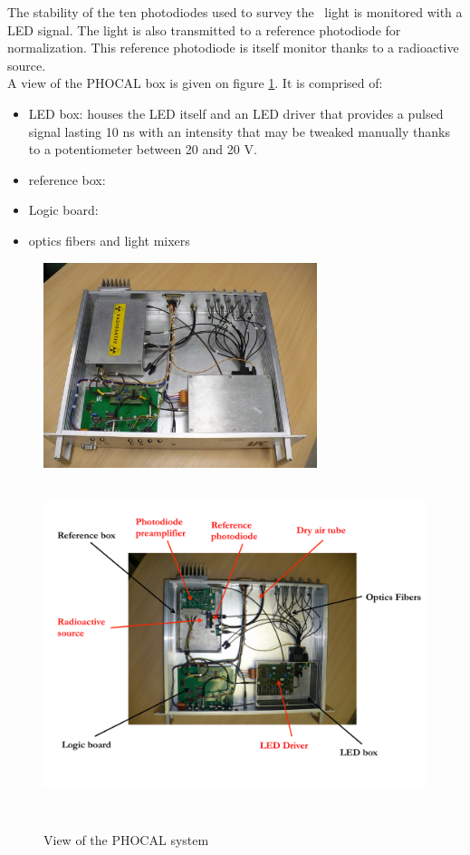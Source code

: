 The stability of the ten photodiodes used to survey the \laser~light is monitored with a LED signal. The light is also transmitted to a reference photodiode for normalization. This reference photodiode is itself monitor thanks to a radioactive source.\\
A view of the PHOCAL box is given on figure \ref{fig:lasphocal}. It is comprised of:
\begin{itemize}
\item LED box: houses the LED itself and an LED driver that provides a pulsed signal lasting 10 ns with an intensity that may be tweaked manually thanks to a potentiometer between 20 and 20 V.
\item reference box: 
\item Logic board:
\item optics fibers and light mixers
\end{itemize}


\begin{figure}[htbp]
\centering
\includegraphics[height=6cm]{figures/phocal1.JPG}
\includegraphics[height=10cm]{figures/phocal2_comm.pdf}
\caption{View of the PHOCAL system}\label{fig:lasphocal}
\end{figure}